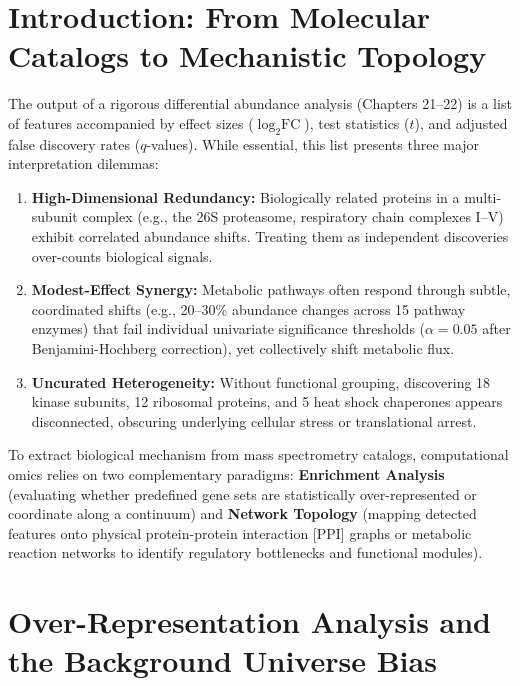 \documentclass[11pt,twoside,openright]{book}
\begin{document}
\vspace{1.5em}

\section{Introduction: From Molecular Catalogs to Mechanistic Topology}

The output of a rigorous differential abundance analysis (Chapters 21--22) is a list of features accompanied by effect sizes ($\log_2 \text{FC}$), test statistics ($t$), and adjusted false discovery rates ($q$-values). While essential, this list presents three major interpretation dilemmas:
\begin{enumerate}
    \item \textbf{High-Dimensional Redundancy:} Biologically related proteins in a multi-subunit complex (e.g., the 26S proteasome, respiratory chain complexes I--V) exhibit correlated abundance shifts. Treating them as independent discoveries over-counts biological signals.
    \item \textbf{Modest-Effect Synergy:} Metabolic pathways often respond through subtle, coordinated shifts (e.g., 20--30\% abundance changes across 15 pathway enzymes) that fail individual univariate significance thresholds ($\alpha = 0.05$ after Benjamini-Hochberg correction), yet collectively shift metabolic flux.
    \item \textbf{Uncurated Heterogeneity:} Without functional grouping, discovering 18 kinase subunits, 12 ribosomal proteins, and 5 heat shock chaperones appears disconnected, obscuring underlying cellular stress or translational arrest.
\end{enumerate}

To extract biological mechanism from mass spectrometry catalogs, computational omics relies on two complementary paradigms: \textbf{Enrichment Analysis} (evaluating whether predefined gene sets are statistically over-represented or coordinate along a continuum) and \textbf{Network Topology} (mapping detected features onto physical protein-protein interaction [PPI] graphs or metabolic reaction networks to identify regulatory bottlenecks and functional modules).

\section{Over-Representation Analysis and the Background Universe Bias}
\end{document}
